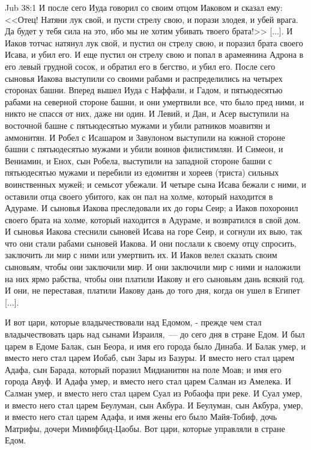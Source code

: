\vs Jub 38:1
И после сего Иуда говорил со своим отцом
Иаковом и сказал ему: <<Отец! Натяни лук свой, и
пусти стрелу свою, и порази злодея, и убей врага.
Да будет у тебя сила на это, ибо мы не хотим
убивать твоего брата!>> [...]. И Иаков тотчас
натянул лук свой, и пустил он стрелу свою, и
поразил брата своего Исава, и убил его. И еще
пустил он стрелу свою и попал в арамеянина Адрона
в его левый грудной сосок, и обратил его в
бегство, и убил его. После сего сыновья Иакова
выступили со своими рабами и распределились на
четырех сторонах башни. Вперед вышел Иуда с
Наффали, и Гадом, и пятьюдесятью рабами на
северной стороне башни, и они умертвили все, что
было пред ними, и никто не спасся от них, даже ни
один. И Левий, и Дан, и Асер выступили на восточной
башне с пятьюдесятью мужами и убили ратников
моавитян и аммонитян. И Робел с Исашаром и
Завулоном выступили на южной стороне башни с
пятьюдесятью мужами и убили воинов филистимлян.
И Симеон, и Вениамин, и Енох, сын Робела, выступили
на западной стороне башни с пятьюдесятью мужами
и перебили из едомитян и хореев (триста) сильных
воинственных мужей; и семьсот убежали. И четыре
сына Исава бежали с ними, и оставили отца своего
убитого, как он пал на холме, который находится в
Адураме. И сыновья Иакова преследовали их до горы
Сеир; а Иаков похоронил своего брата на холме,
который находится в Адураме, и возвратился в свой
дом. И сыновья Иакова стеснили сыновей Исава на
горе Сеир, и согнули их выю, так что они стали
рабами сыновей Иакова. И они послали к своему
отцу спросить, заключить ли мир с ними или
умертвить их. И Иаков велел сказать своим
сыновьям, чтобы они заключили мир. И они
заключили мир с ними и наложили на них ярмо
рабства, чтобы они платили Иакову и его сыновьям
дань всякий год. И они, не переставая, платили
Иакову дань до того дня, когда он ушел в Египет
[...].

И вот цари, которые владычествовали над Едомом,
- прежде чем стал владычествовать царь над сынами
Израиля,~--- до сего дня в стране Едом. И был царем в
Едоме Балак, сын Беора, и имя его города было
Динаба. И Балак умер, и вместо него стал царем
Иобаб, сын Зары из Базуры. И вместо него стал
царем Адафа, сын Барада, который поразил
Мидианитян на поле Моав; и имя его города Авуф. И
Адафа умер, и вместо него стал царем Салман из
Амелека. И Салман умер, и вместо него стал царем
Суал из Робаофа при реке. И Суал умер, и вместо
него стал царем Беулуман, сын Акбура. И Беулуман,
сын Акбура, умер, и вместо него стал царем Адафа, и
имя жены его было Майя-Тобиф, дочь Матрифы, дочери
Мимифбид-Цаобы. Вот цари, которые управляли в
стране Едом.

